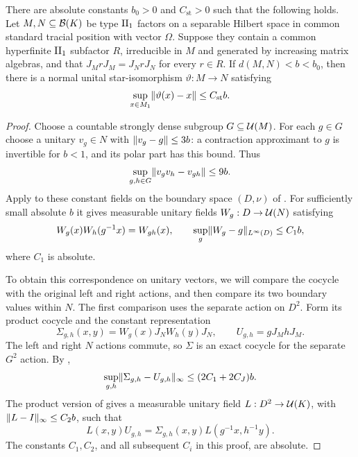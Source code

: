 \begin{proposition}
\label{prop:finite-standard-isomorphism}
There are absolute constants $b_0>0$ and $C_{\mathrm{st}}>0$ such that
the following holds. Let $M,N\subseteq\mathcal B(K)$ be type $\mathrm{II}_1$ factors
on a separable Hilbert space in common standard tracial position with
vector $\Omega$. Suppose they contain a common hyperfinite $\mathrm{II}_1$
subfactor $R$, irreducible in $M$ and generated by increasing matrix
algebras, and that $J_MrJ_M=J_NrJ_N$ for every $r\in R$.
If $d(M,N)<b<b_0$, then there is
a normal unital star-isomorphism $\vartheta:M\to N$ satisfying
\[
 \sup_{x\in M_1}\lVert\vartheta(x)-x\rVert\le C_{\mathrm{st}}b.
\]
\end{proposition}
\begin{proof}
Choose a countable strongly dense subgroup $G\subseteq\mathcal U(M)$.
For each $g\in G$ choose a unitary $v_g\in N$ with
$\lVert v_g-g\rVert\le3b$: a contraction approximant to $g$ is invertible
for $b<1$, and its polar part has this bound.  Thus
\[
 \sup_{g,h\in G}\lVert v_gv_h-v_{gh}\rVert\le9b.
\]
Apply  to these constant fields on the
boundary space $(D,\nu)$ of .  For sufficiently
small absolute $b$ it gives measurable unitary fields $W_g:D\to\mathcal U(N)$
satisfying
\begin{equation}
 W_g(x)W_h(g^{-1}x)=W_{gh}(x),\qquad
 \sup_g\lVert W_g-g\rVert_{L^\infty(D)}\le C_1b,
 \label{eq:finite-boundary-cocycle}
\end{equation}
where $C_1$ is absolute.

To obtain this correspondence on unitary vectors, we will compare the
cocycle with the original left and right actions, and then compare its
two boundary values within $N$.  The first comparison uses the separate
action on $D^2$.  Form its product cocycle and the constant representation
\[
 \Sigma_{g,h}(x,y)=W_g(x)J_NW_h(y)J_N,
 \qquad U_{g,h}=gJ_MhJ_M.
\]
The left and right $N$ actions commute, so $\Sigma$ is an exact cocycle
for the separate $G^2$ action.  By
,
\[
 \sup_{g,h}\lVert\Sigma_{g,h}-U_{g,h}\rVert_\infty
 \le(2C_1+2C_J)b.
\]
The product version of  gives a measurable
unitary field $L:D^2\to\mathcal U(K)$, with $\lVert L-I\rVert_\infty\le C_2b$, such
that
\begin{equation}
 L(x,y)U_{g,h}=\Sigma_{g,h}(x,y)L(g^{-1}x,h^{-1}y).
 \label{eq:finite-product-intertwiner}
\end{equation}
The constants $C_1,C_2$, and all subsequent $C_i$ in this proof, are
absolute.


\end{proof}
